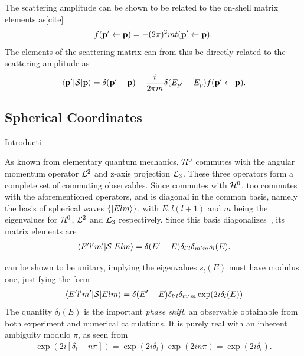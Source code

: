 The scattering amplitude can be shown to be related to the on-shell 
matrix elements as[cite]
\begin{align*}
  f(\vb{p}^{\prime} \leftarrow \vb{p})= -(2\pi)^{2}mt(\vb{p}^{\prime}\leftarrow\vb{p}).
\end{align*}
The elements of the scattering matrix can from this be directly related to the
scattering amplitude as
\begin{align*}
  \mel{\vb{p}^{\prime}}{\mathcal{S}}{\vb{p}} = \delta(\vb{p}^{\prime} - \vb{p}) - \frac{i}{2\pi m}\delta(E_{p^{\prime}}-E_{p})f(\vb{p}^{\prime}\leftarrow \vb{p}).
\end{align*}

\subsection{Spherical Coordinates}

Introducti

As known from elementary quantum mechanics, \(\mathcal{H}^{0}\) commutes with the
angular momentum operator \(\mathcal{L}^{2}\) and z-axis projection \(\mathcal{L}_{3}\).
These three operators form a complete set of commuting observables. Since
\mscat{} commutes with \(\mathcal{H}^{0}\), \mscat{} too commutes with the
aforementioned 
operators, and is diagonal in the common basis, namely the basis of spherical waves
\(\left\{ \ket{Elm} \right\}\), with \(E, l(l+1)\) and \(m\) being the
eigenvalues for \(\mathcal{H}^{0}\),  \(\mathcal{L}^{2}\) and  \(\mathcal{L}_{3}\)
respectively. Since this basis diagonalizes\ \mscat{}, its matrix elements are
\begin{align*}
  \mel{E^{\prime}l^{\prime}m^{\prime}}{\mathcal{S}}{Elm} = \delta(E^{\prime}-E)\delta_{l^{\prime}l}\delta_{m^{\prime}m}s_{l}(E).
\end{align*}

\mscat{} can be shown to be unitary, implying the eigenvalues \(s_{l}(E)\) must have
modulus one, justifying the form
\begin{align*}
  \mel{E^{\prime}l^{\prime}m^{\prime}}{\mathcal{S}}{Elm} = \delta(E^{\prime}-E)\delta_{l^{\prime}l}\delta_{m^{\prime}m}\exp(2i\delta_{l}(E))
\end{align*}
The quantity \(\delta_{l}(E)\) is the important \textit{phase shift}, an
observable obtainable from both experiment and numerical calculations. It is
purely real with an inherent ambiguity modulo \(\pi\), as seen from
\begin{align*}
  \exp(2i[\delta_{l}+n\pi]) = \exp(2i\delta_{l})\exp(2in\pi) = \exp(2i\delta_{l}).
\end{align*}

